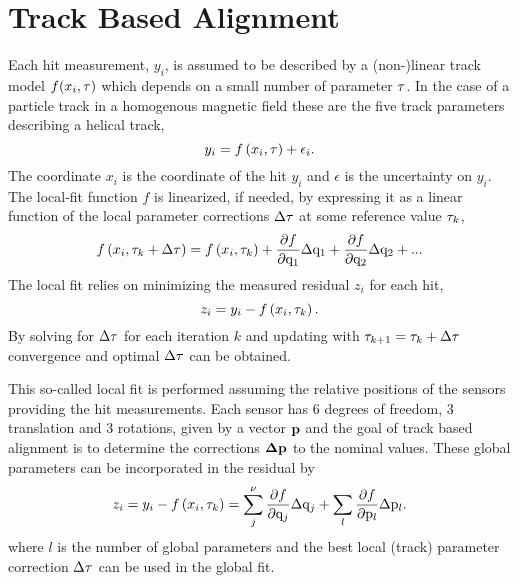 \documentclass{article}
\def\vec#1{\ensuremath{\mathrm{\bf #1}}}
\begin{document}
\section{Track Based Alignment}
Each hit measurement, $y_i$, is assumed to be described by a (non-)linear 
track model $f(x_i,\vec{\tau})$ which depends on a small number of parameter $\vec{\tau}$. 
In the case of a particle track in a homogenous magnetic field these are the five track 
parameters describing a helical track,
\begin{equation}
y_i = f\left( x_i,\vec{\tau} \right) + \epsilon_i.
\end{equation}
The coordinate $x_i$ is the coordinate of the hit $y_i$ and $\epsilon$ is the 
uncertainty on $y_i$. The local-fit function $f$ is linearized, if needed, by expressing 
it as a linear function of the local parameter corrections $\Delta\vec{\tau}$ at some reference 
value $\vec{\tau}_k$,
\begin{equation}
f\left( x_i,\vec{\tau}_k+\Delta\vec{\tau} \right) = f\left( x_i,\vec{\tau}_k \right) +  \frac{\partial f}{\partial \mathrm{q}_1}\Delta \mathrm{q}_1 +  \frac{\partial f}{\partial \mathrm{q}_2}\Delta \mathrm{q}_2 + ...
\end{equation}
The local fit relies on minimizing the measured residual $z_i$ for each hit,
\begin{equation}
z_i = y_i-f\left( x_i,\vec{\tau}_k\right).
\end{equation}
By solving for $\Delta\vec{\tau}$ for each iteration $k$ and updating with 
$\vec{\tau}_{k+1}=\vec{\tau}_k+\Delta\vec{\tau}$ convergence and optimal $\Delta\vec{\tau}$ can be obtained. 

This so-called local fit is performed assuming the relative positions of the sensors providing 
the hit measurements. Each sensor has 6 degrees of freedom, 3 translation and 3 rotations, 
given by a vector $\vec{p}$ and the goal of track based alignment is to determine the corrections 
$\vec{\Delta p}$ to the nominal values. These global parameters can be incorporated in the 
residual by  
\begin{equation}
z_i=y_i- f\left( x_i,\vec{\tau}_k\right) = \sum_j^{\nu}{ \frac{\partial f}{\partial \mathrm{q}_j}\Delta \mathrm{q}_j } +  \sum_l{ \frac{\partial f}{\partial \mathrm{p}_l}\Delta \mathrm{p}_l }.
\end{equation}
where $l$ is the number of global parameters and the best local (track) parameter 
correction $\Delta\vec{\tau}$ can be used in the global fit. 
\end{document}
